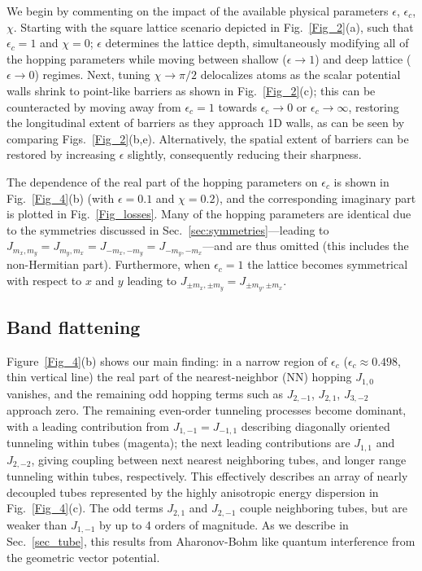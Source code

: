 \documentclass[aps,pra,twocolumn,showpacs,superscriptaddress,floatfix,longbibliography]{revtex4-1}
\begin{document}
We begin by commenting on the impact of the available physical parameters $\epsilon$, $\epsilon_c$, $\chi$.
Starting with the square lattice scenario depicted in Fig.~\ref{Fig_2}(a), such that $\epsilon_c = 1$ and $\chi=0$; $\epsilon$ determines the lattice depth, simultaneously modifying all of the hopping parameters while moving between shallow ($\epsilon \rightarrow 1$) and deep lattice ($\epsilon \rightarrow 0$) regimes.
Next, tuning $\chi \rightarrow \pi/2$ delocalizes atoms as the scalar potential walls shrink to point-like barriers as shown in Fig.~\ref{Fig_2}(c); this can be counteracted by moving away from $\epsilon_c = 1$ towards $\epsilon_c \rightarrow 0$ or $\epsilon_c \rightarrow \infty$, restoring the longitudinal extent of barriers as they approach 1D walls, as can be seen by comparing Figs.~\ref{Fig_2}(b,e). 
Alternatively, the spatial extent of barriers can be restored by increasing $\epsilon$ slightly, consequently reducing their sharpness.

The dependence of the real part of the hopping parameters on $\epsilon_c$ is shown in Fig.~\ref{Fig_4}(b) (with $\epsilon = 0.1$ and $\chi=0.2$), and the corresponding imaginary part is plotted in Fig.~\ref{Fig_losses}.
Many of the hopping parameters are identical due to the symmetries discussed in Sec.~\ref{sec:symmetries}---leading to $J_{m_x, m_y} = J_{m_y, m_x} = J_{-m_x, -m_y} = J_{-m_y, -m_x}$---and are thus omitted (this includes the non-Hermitian part).
Furthermore, when $\epsilon_c = 1$ the lattice becomes symmetrical with respect to $x$ and $y$ leading to $J_{\pm m_x, \pm m_y} = J_{\pm m_y, \pm m_x} $.

\subsection{Band flattening}

Figure~\ref{Fig_4}(b) shows our main finding: in a narrow region of $\epsilon_c$ ($\epsilon_c \approx 0.498$, thin vertical line) the real part of the nearest-neighbor (NN) hopping $J_{1,0}$ vanishes, and the remaining odd hopping terms such as $J_{2,-1}$, $J_{2,1}$, $J_{3,-2}$ approach zero.
The remaining even-order tunneling processes become dominant, with a leading contribution from $J_{1,-1}=J_{-1,1}$ describing diagonally oriented tunneling within tubes (magenta); the next leading contributions are $J_{1,1}$ and $J_{2,-2}$, giving coupling between next nearest neighboring tubes, and longer range tunneling within tubes, respectively. 
This effectively describes an array of nearly decoupled tubes represented by the highly anisotropic energy dispersion in Fig.~\ref{Fig_4}(c).
The odd terms $J_{2,1}$ and $J_{2,-1}$ couple neighboring tubes, but are weaker than $J_{1,-1}$ by up to 4 orders of magnitude.
As we describe in Sec.~\ref{sec_tube}, this results from Aharonov-Bohm like quantum interference from the geometric vector potential.
\end{document}
